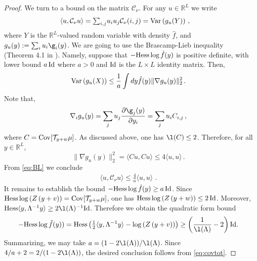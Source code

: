 \documentclass[11pt,reqno]{amsart}
\numberwithin{equation}{section}
\numberwithin{figure}{section}
\newcommand{\cov}{{\rm Cov}}
\newcommand{\var}{{\rm Var}}
\newcommand{\1}{\mathds{1}}
\newcommand{\scalar}[2]{\langle #1 , #2\rangle}
\let\G=\Gamma
\let\L=\Lambda
\newcommand{\cC}{\ensuremath{\mathcal C}}
\newcommand{\bbR}{{\ensuremath{\mathbb R}} }
\begin{document}
\begin{proof}
	 
We turn to a bound on the matrix $\cC_\nu$. For any $u \in\bbR^{L}$ we write
	\begin{align}\label{eq:covy}
		\scalar{u}{\cC_\nu u} &= \textstyle{\sum_{i,j}}u_iu_j\cC_\nu(i,j)=\var\left(g_u(Y)\right)\,, 
			\end{align}
where $Y$ is the $\bbR^{L}$-valued random variable with density $\hat f$, %
and %
$g_u(y):=\sum_{i} u_i  \g_i(y)$. 
We are going to use the Brascamp-Lieb inequality (Theorem 4.1 in \cite{brasclieb}). %
Namely, suppose that %
$-{\rm Hess}\log \hat f (y)$ is positive definite, with  lower bound $a\,{\rm Id}$ where $a>0$ and ${\rm Id}$ is the $L\times L$ identity matrix. Then, %
	\begin{align}\label{eq:BL}
	\var\left(g_u(X)\right)\le \frac1a\int dy \hat f(y)\|\nabla g_u(y)\|_2^2 \,.
	\end{align}
Note that, 
\[
\nabla_i g_u(y) = \sum_{j} u_j  \frac{\partial\g_j(y)}{\partial y_i}= \sum_{j}u_i C_{i,j}\,,
\]
where $C=\cov [\mathcal{T}_{y+w}\mu]$.  As discussed above, one has $\l(C)\le 2$.
Therefore,  for all $y\in\bbR^{L}$,  
\[
	\|\nabla g_u(y)\|_2^2=\scalar{Cu}{Cu}\le 4\scalar{u}{u}\,.
	\] 
From \eqref{eq:BL} we conclude 	
\begin{align}\label{eq:BL2}
	\scalar{u}{\cC_\nu u} \le \frac{4}{a} \scalar{u}{u}\,\,.
	\end{align}	
	It remains to establish the bound $-{\rm Hess}\log \hat f (y)\ge a\,{\rm Id}$. 
	Since ${\rm Hess}\log\left(Z\left(y + v\right)\right) =  \cov[\mathcal{T}_{y + w}\mu]$,  one has
	 ${\rm Hess}\log\left(Z\left(y + w\right)\right)\le  2\,{\rm Id}$. Moreover, ${\rm Hess}\scalar{y}{\L^{-1}y}\ge 2\l(\L)^{-1}{\rm Id}$. Therefore we obtain the quadratic form bound
		\begin{align}\label{eq:BLineq3}
-{\rm Hess}\log \hat f(y) )= {\rm Hess}\left(\tfrac{1}2\scalar{y}{\L^{-1}y} - \log\left(Z\left(y + v\right)\right) \right)\ge 
\left(\frac{1}{\l(\L)} -2\right){\rm Id}.
	\end{align}
	Summarizing, we may take $a =  (1-2\l(\L))/\l(\L)$. Since $4/a + 2 =  2/(1-2\l(\L))$, the desired conclusion follows from  \eqref{eq:covtot}. 
\end{proof}
\end{document}
